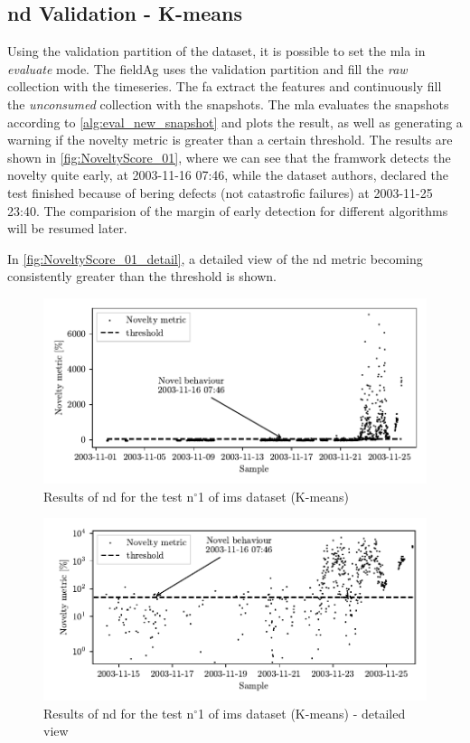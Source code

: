 \subsection{\gls{nd} Validation - K-means}
Using the validation partition of the dataset, it is possible to set the \gls{mla} in \emph{evaluate} mode. The \gls{fieldAg} uses the validation partition and fill the \emph{raw} collection with the timeseries. The {\gls{fa}} extract the features and continuously fill the \emph{unconsumed} collection with the snapshots. The \gls{mla} evaluates the snapshots according to \autoref{alg:eval_new_snapshot}  and plots the result, as well as generating a warning if the novelty metric is greater than a certain threshold. The results are shown in \autoref{fig:NoveltyScore_01}, where we can see that the framwork detects the novelty quite early, at 2003-11-16 07:46, while the dataset authors, declared the test finished because of bering defects (not catastrofic failures) at 2003-11-25 23:40. The comparision of the margin of early detection for different algorithms will be resumed later.

In \autoref{fig:NoveltyScore_01_detail}, a detailed view of the \gls{nd} metric becoming consistently greater than the threshold is shown.

\begin{figure}
    \centering
    \includegraphics{images/IMS/Novelty_01_500samples_bearing3x.pdf}
    \caption{Results of \gls{nd} for the test $\text{n}^\circ$1 of \gls{ims} dataset (K-means)}
    \label{fig:NoveltyScore_01} 
\end{figure}

\begin{figure}
    \centering
    \includegraphics{images/IMS/Novelty_01_500samples_bearing3x_detail.pdf}
    \caption{Results of \gls{nd} for the test $\text{n}^\circ$1 of \gls{ims} dataset (K-means) - detailed view}
    \label{fig:NoveltyScore_01_detail} 
\end{figure}

